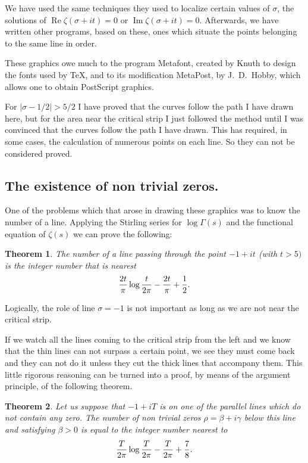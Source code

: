 \documentclass[a4paper]{amsart}
\newtheorem{Teorema}{Theorem}
\numberwithin{equation}{section}
\def\Re{\operatorname{\text{Re}}}
\def\Im{\operatorname{\text{Im}}}
\begin{document}
\begin{large}
We have used the same techniques they used to localize certain values of
$\sigma$, the solutions of $\Re\zeta(\sigma + it)= 0$ or $\Im\zeta(\sigma +
it)=0$. Afterwards, we have written other programs, based on these, 
ones which
situate the points belonging to the same line in order.

These graphics owe much to the program Metafont, created by Knuth to design the
fonts used by \TeX, and to its modification MetaPost, by J.~D.~Hobby, which
allows one to obtain PostScript graphics.

For $|\sigma - 1/2|>5/2$ I have proved that the curves follow the
path I have drawn here, but for the area near the critical strip I just
followed the method until I was convinced that the curves follow the path I
have drawn. This has required, in some cases, the calculation of numerous
points on each line. So they can not be considered proved.



\subsection{ The existence of non trivial zeros.}
One of the problems which that arose
in drawing these graphics was to know the number of a line. Applying the
Stirling series for $\log\Gamma(s)$ and the functional equation of $\zeta(s)$ we
can prove the following:
\begin{Teorema}\label{T:A} 
The number of a line passing through the point $-1 + it$ (with
$t>5)$ is the integer number that is nearest
\begin{equation}
{2 t\over\pi}\log{ t\over 2\pi}-{2 t\over \pi}+{1\over2}.\label{E:Uno}\end{equation}
\end{Teorema}
Logically, the role of line $\sigma=-1$ is not important as long as we are not
near the critical strip.

If we watch all the lines coming to the critical strip from the left and we
know that the thin lines can not surpass a certain point, we see they must come
back and they can not do it unless they cut the thick lines that accompany
them. This little rigorous reasoning can be turned into a proof, by means of
the argument principle, of the following theorem.

\vfil\eject

\begin{Teorema}
    Let us suppose that $-1 + iT$ is on one of the
parallel lines which do not contain any zero. The number of non
trivial zeros $\rho=\beta + i\gamma$ below this line and
satisfying $\beta>0$ is equal to the integer number nearest to
\begin{equation}
{T\over2\pi}\log{T\over2\pi}-{T\over2\pi}+{7\over 8}.
\label{E:Dos}
\end{equation}
\end{Teorema}





\end{large}
\end{document}
